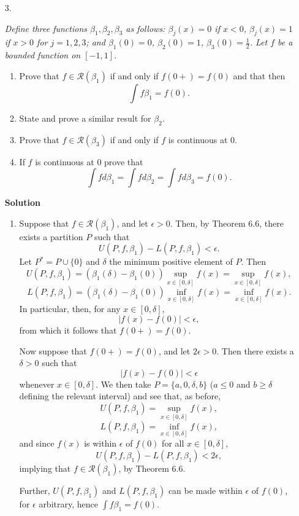 \documentclass{article}
\begin{document}
\begin{enumerate}
\begin{itemize}
\item[3.] {\em Define three functions \(\beta_1, \beta_2, \beta_3\) as follows:  \(\beta_j(x) = 0\) if \(x < 0\), \(\beta_j(x) = 1\) if \(x > 0\) for \(j = 1,2,3\); and \(\beta_1(0) = 0\), \(\beta_2(0) = 1\), \(\beta_3(0) = \frac{1}{2}\).  Let \(f\) be a bounded function on \([-1,1]\).
\begin{enumerate}
\item Prove that \(f \in \mathcal{R}(\beta_1)\) if and only if \(f(0+) = f(0)\) and that then
\[\int f \beta_1 = f(0).\]
\item State and prove a similar result for \(\beta_2\).
\item Prove that \(f \in \mathcal{R}(\beta_3)\) if and only if \(f\) is continuous at \(0\).
\item If \(f\) is continuous at \(0\) prove that
\[\int f d\beta_1 = \int f d\beta_2 = \int f d\beta_3 = f(0).\]
\end{enumerate}}

{\bf Solution}

\begin{enumerate}
\item Suppose that \(f \in \mathcal{R}(\beta_1)\), and let \(\epsilon > 0\).  Then, by Theorem 6.6, there exists a partition \(P\) such that
\[U(P,f,\beta_1) - L(P,f,\beta_1) < \epsilon.\]
Let \(P^* = P \cup \{0\}\) and \(\delta\) the minimum positive element of \(P\).  Then
\[U(P,f,\beta_1) = \left( \beta_1(\delta) - \beta_1(0) \right) \sup_{x \in [0,\delta]} f(x)
                 = \sup_{x \in [0,\delta]} f(x),\]
\[L(P,f,\beta_1) = \left( \beta_1(\delta) - \beta_1(0) \right) \inf_{x \in [0,\delta]} f(x)
                 = \inf_{x \in [0,\delta]} f(x).\]
In particular, then, for any \(x \in [0,\delta]\),
\[|f(x) - f(0)| < \epsilon,\]
from which it follows that \(f(0+) = f(0)\).

Now suppose that \(f(0+) = f(0)\), and let \(2\epsilon > 0\).  Then there exists a \(\delta > 0\) such that
\[|f(x) - f(0)| < \epsilon\]
whenever \(x \in [0,\delta]\).  We then take \(P = \{a, 0, \delta, b\}\) (\(a \leq 0\) and \(b \geq \delta\) defining the relevant interval) and see that, as before,
\[U(P,f,\beta_1) = \sup_{x \in [0,\delta]} f(x),\]
\[L(P,f,\beta_1) = \inf_{x \in [0,\delta]} f(x),\]
and since \(f(x)\) is within \(\epsilon\) of \(f(0)\) for all \(x \in [0,\delta]\),
\[U(P,f,\beta_1) - L(P,f,\beta_1) < 2\epsilon,\]
implying that \(f \in \mathcal{R}(\beta_1)\), by Theorem 6.6.

Further, \(U(P,f,\beta_1)\) and \(L(P,f,\beta_1)\) can be made within \(\epsilon\) of \(f(0)\), for \(\epsilon\) arbitrary, hence \(\int f \beta_1 = f(0)\).


\end{enumerate}
\end{itemize}
\end{enumerate}
\end{document}
